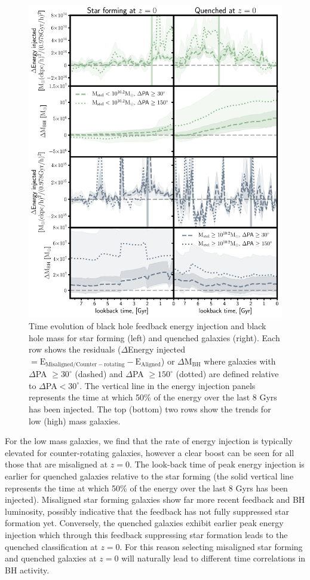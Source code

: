 \begin{figure}
	\includegraphics[width=\linewidth]{misalignment_BH/BH_props_only.pdf}
    \caption{Time evolution of black hole feedback energy injection and black hole mass for star forming (left) and quenched galaxies (right). Each row shows the residuals ($\Delta$Energy injected$\mathrm{ = E_{Misaligned/Counter-rotating} - E_{Aligned}}$) or $\Delta \mathrm{M_{BH}}$ where galaxies with $\Delta$PA $\geq 30^{\circ}$ (dashed) and $\Delta$PA $\geq 150^{\circ}$ (dotted) are defined relative to $\Delta$PA$ < 30^{\circ}$. The vertical line in the energy injection panels represents the time at which 50\% of the energy over the last 8 Gyrs has been injected. The top (bottom) two rows show the trends for low (high) mass galaxies.}
    \label{fig:BH_props}
\end{figure}

For the low mass galaxies, we find that the rate of energy injection is typically elevated for counter-rotating galaxies, however a clear boost can be seen for all those that are misaligned at $z=0$. The look-back time of peak energy injection is earlier for quenched galaxies relative to the star forming (the solid vertical line represents the time at which 50\% of the energy over the last 8 Gyrs has been injected). Misaligned star forming galaxies show far more recent feedback and BH luminosity, possibly indicative that the feedback has not fully suppressed star formation yet. Conversely, the quenched galaxies exhibit earlier peak energy injection which through this feedback suppressing star formation leads to the quenched classification at $z=0$. For this reason selecting misaligned star forming and quenched galaxies at $z=0$ will naturally lead to different time correlations in BH activity.

